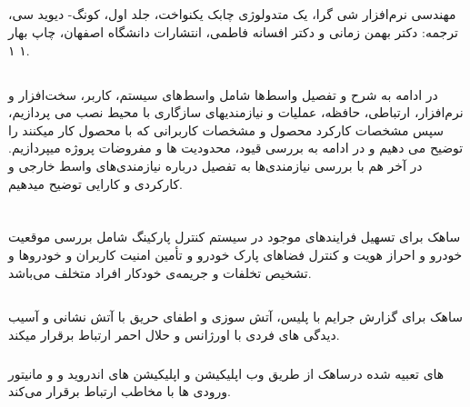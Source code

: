 \documentclass[oneside,a4paper,12pt]{book}
\begin{document}
	\section{}
	مهندسی نرم‌افزار شی گرا، یک متدولوژی چابک یکنواخت، جلد اول، کونگ- دیوید سی، ترجمه: دکتر بهمن زمانی و
	دکتر افسانه فاطمی، انتشارات دانشگاه اصفهان، چاپ بهار .۱
	۱
	\section{}
	در ادامه به شرح و تفصیل واسط‌ها شامل واسط‌های سیستم، کاربر، سخت‌افزار و نرم‌افزار، ارتباطی، حافظه، عملیات و نیازمندیهای سازگاری با محیط نصب می پردازیم، سپس مشخصات کارکرد محصول و مشخصات کاربرانی که با محصول کار میکنند را توضیح می دهیم و در ادامه به بررسی قیود، محدودیت ها و مفروضات پروژه میپردازیم. در آخر هم با بررسی نیازمندی‌ها به تفصیل درباره نیازمندی‌های واسط خارجی و کارکردی و کارایی توضیح میدهیم.
	
	
	
	\chapter{}
	ساهک برای تسهیل فرایند‌های موجود در سیستم کنترل پارکینگ  شامل بررسی موقعیت خودرو و احراز هویت و کنترل فضاهای پارک خودرو و  تأمین امنیت کاربران و خودروها و تشخیص تخلفات و جریمه‌ی خودکار افراد متخلف می‌باشد.
	\section{}
	
	\subsection{}
	ساهک برای گزارش جرایم با پلیس، آتش سوزی و اطفای حریق با آتش نشانی و آسیب دیدگی های فردی با اورژانس و حلال احمر ارتباط برقرار میکند.
	
	\subsection{}
	ساهک از طریق وب اپلیکیشن و اپلیکیشن های اندروید و  و مانیتور‎های تعبیه شده در ورودی ها با مخاطب ارتباط برقرار می‌کند.
	
	
\end{document}
